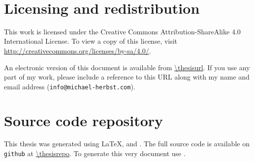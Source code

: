 \clearpage
\ifodd\value{page}\hbox{}\newpage\fi

\thispagestyle{plain}
\
\vfill
\section*{Licensing and redistribution}
{}

This work is licensed under the Creative Commons Attribution-ShareAlike 4.0
International License.
To view a copy of this license,
visit \url{http://creativecommons.org/licenses/by-sa/4.0/}.
\begin{center}
\end{center}
An electronic version of this document is available from
\url{\thesisurl}.
If you use any part of my work,
please include a reference to this URL along with my name and email address
\linebreak
(\texttt{info@michael-herbst.com}).

\section*{Source code repository}
{}
This thesis was generated using \LaTeX, \python and \molsturm.
The full source code is available
on \texttt{github} at \url{\thesisrepo}.
To generate this very document use \gitcurrent.
